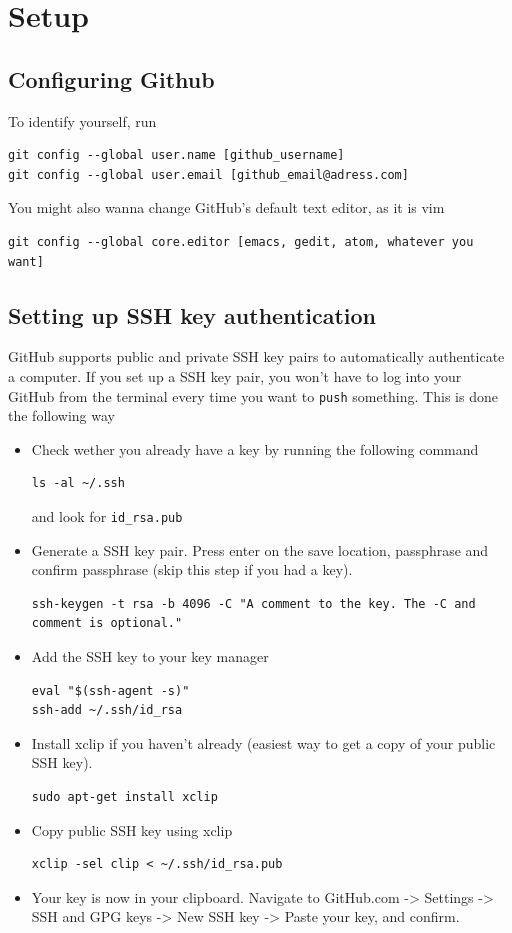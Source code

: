 \documentclass[12p,a4paper]{article}
\begin{document}
\section{Setup}
\subsection{Configuring Github}
To identify yourself, run
\begin{verbatim}
git config --global user.name [github_username]
git config --global user.email [github_email@adress.com]
\end{verbatim}
You might also wanna change GitHub's default text editor, as it is vim
\begin{verbatim}
git config --global core.editor [emacs, gedit, atom, whatever you want]
\end{verbatim}


\subsection{Setting up SSH key authentication}
GitHub supports public and private SSH key pairs to automatically authenticate a computer. If you set up a SSH key pair, you won't have to log into your GitHub from the terminal every time you want to \texttt{push} something. This is done the following way
\begin{itemize}
\item Check wether you already have a key by running the following command
\begin{verbatim}
ls -al ~/.ssh
\end{verbatim}
and look for \texttt{id\_rsa.pub}
\item Generate a SSH key pair. Press enter on the save location, passphrase and confirm passphrase (skip this step if you had a key).
\begin{verbatim}
ssh-keygen -t rsa -b 4096 -C "A comment to the key. The -C and comment is optional."
\end{verbatim}
\item Add the SSH key to your key manager
\begin{verbatim}
eval "$(ssh-agent -s)"
ssh-add ~/.ssh/id_rsa
\end{verbatim}
\item Install xclip if you haven't already (easiest way to get a copy of your public SSH key).
\begin{verbatim}
sudo apt-get install xclip
\end{verbatim}
\item Copy public SSH key using xclip
\begin{verbatim}
xclip -sel clip < ~/.ssh/id_rsa.pub
\end{verbatim}
\item Your key is now in your clipboard. Navigate to GitHub.com -> Settings -> SSH and GPG keys -> New SSH key -> Paste your key, and confirm.
\end{itemize}
\end{document}
